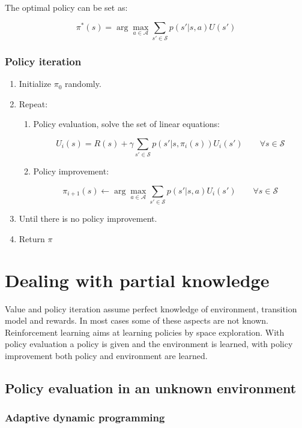 		The optimal policy can be set as:

		$$\pi^*(s) = \arg\max\limits_{a\in\mathcal{A}}\sum\limits_{s'\in\mathcal{S}}p(s'|s,a)U(s')$$

		\subsubsection{Policy iteration}

		\begin{enumerate}
			\item Initialize $\pi_0$ randomly.
			\item Repeat:

				\begin{enumerate}
					\item Policy evaluation, solve the set of linear equations:

						$$U_i(s) = R(s) + \gamma\sum\limits_{s'\in\mathcal{S}}p(s'|s,\pi_i(s))U_i(s')\qquad\forall s\in\mathcal{S}$$

					\item Policy improvement:

						$$\pi_{i+1}(s)\leftarrow \arg\max\limits_{a\in\mathcal{A}}\sum\limits_{s'\in\mathcal{S}}p(s'|s,a)U_i(s')\qquad\forall s\in\mathcal{S}$$

				\end{enumerate}

			\item Until there is no policy improvement.
			\item Return $\pi$
		\end{enumerate}

\section{Dealing with partial knowledge}
Value and policy iteration assume perfect knowledge of environment, transition model and rewards.
In most cases some of these aspects are not known.
Reinforcement learning aims at learning policies by space exploration.
With policy evaluation a policy is given and the environment is learned, with policy improvement both policy and environment are learned.

	\subsection{Policy evaluation in an unknown environment}

		\subsubsection{Adaptive dynamic programming}

